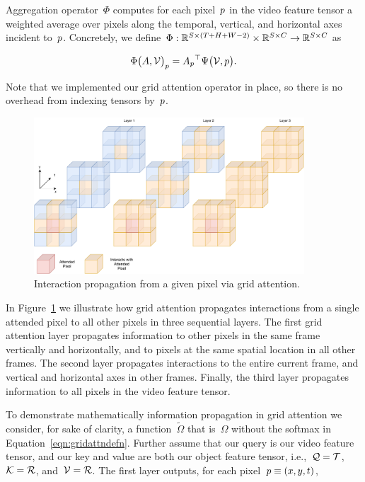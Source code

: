 Aggregation operator~$\Phi$ computes for each pixel~$p{}$ in the video
feature tensor a weighted average over pixels along the temporal, vertical, and
horizontal axes incident to~$p{}$.
Concretely, we
define~$\Phi : \mathbb{R}{}^{S\times (T + H + W - 2)} \times \mathbb{R}{}^{S\times C} \rightarrow \mathbb{R}{}^{S\times C}$
as

\begin{equation}
        {\Phi\big(A, \mathcal{V}{}\big)}_p{} =  {A_p{}}^\top \Psi\big(\mathcal{V}{}, p{}\big).
\end{equation}

Note that we implemented our grid attention operator in place, so there is no
overhead from indexing tensors by~$p{}$.

\begin{figure}
\centering
\includegraphics[width=0.9\textwidth]{Figures/gridattention.pdf}
\caption{Interaction propagation from a given pixel via grid attention.}
\label{fig:ainadecoder}
\end{figure}

In Figure~\ref{fig:ainadecoder} we illustrate how grid attention propagates
interactions from a single attended pixel to all other pixels in three
sequential layers.
The first grid attention layer propagates information to other pixels in the
same frame vertically and horizontally, and to pixels at the same spatial
location in all other frames.
The second layer propagates interactions to the entire current frame, and
vertical and horizontal axes in other frames.
Finally, the third layer propagates information to all pixels in the video
feature tensor.

To demonstrate mathematically information propagation in grid attention we
consider, for sake of clarity, a function~$\tilde{\Omega}$ that is~$\Omega$
without the softmax in Equation~\ref{eqn:gridattndefn}.
Further assume that our query is our video feature tensor, and our key and
value are both our object feature tensor,
i.e.,~$\mathcal{Q}{} = \mathcal{T}{}$,~$\mathcal{K}{} = \mathcal{R}{}$,
and~$\mathcal{V}{} = \mathcal{R}{}$.
The first layer outputs, for each pixel~$p{} \equiv (x, y, t)$,

